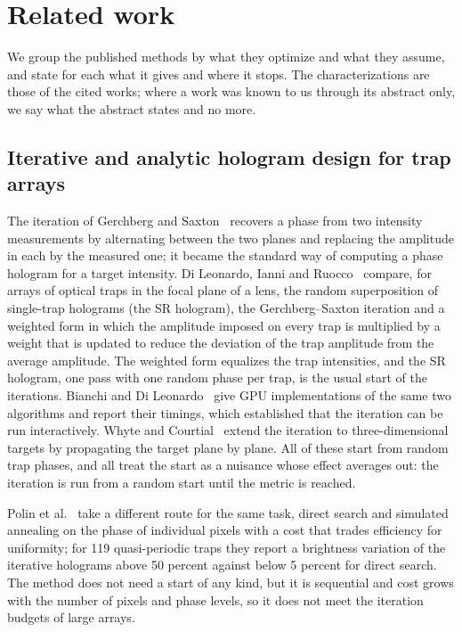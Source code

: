 \section{Related work}\label{sec:related}

We group the published methods by what they optimize and what they assume, and state for each what it gives and where it stops. The characterizations
are those of the cited works; where a work was known to us through its abstract only, we say what the abstract states and no more.

\subsection{Iterative and analytic hologram design for trap arrays}\label{sec:rel-gs}

The iteration of Gerchberg and Saxton~\cite{gs1972} recovers a phase from two intensity measurements by alternating between the two planes and replacing the amplitude in each by the measured one; it
became the standard way of computing a phase hologram for a target intensity. Di Leonardo, Ianni and Ruocco~\cite{dileonardo} compare, for arrays of optical traps in the focal plane of a lens, the random superposition of
single-trap holograms (the SR hologram), the Gerchberg--Saxton iteration and a weighted form in which the amplitude imposed on every trap is multiplied by a weight that is updated to reduce the deviation of the trap amplitude from
the average amplitude. The weighted form equalizes the trap intensities, and the SR hologram, one pass with one random phase per trap, is the usual start of the iterations. Bianchi and Di Leonardo~\cite{bianchi} give GPU implementations of the same
two algorithms and report their timings, which established that the iteration can be run interactively. Whyte and Courtial~\cite{whyte} extend the iteration to three-dimensional targets by propagating the target plane by plane. All of
these start from random trap phases, and all treat the start as a nuisance whose effect averages out: the iteration is run from a random start until the metric is reached.

Polin et al.~\cite{polin} take a different route for the same task, direct search and simulated annealing on the phase of individual pixels with a cost that trades efficiency for uniformity; for 119 quasi-periodic traps they report a brightness variation of the iterative
holograms above 50 percent against below 5 percent for direct search. The method does not need a start of any kind, but it is sequential and cost grows with the number of pixels and phase levels, so it does not meet the iteration budgets of large arrays.

